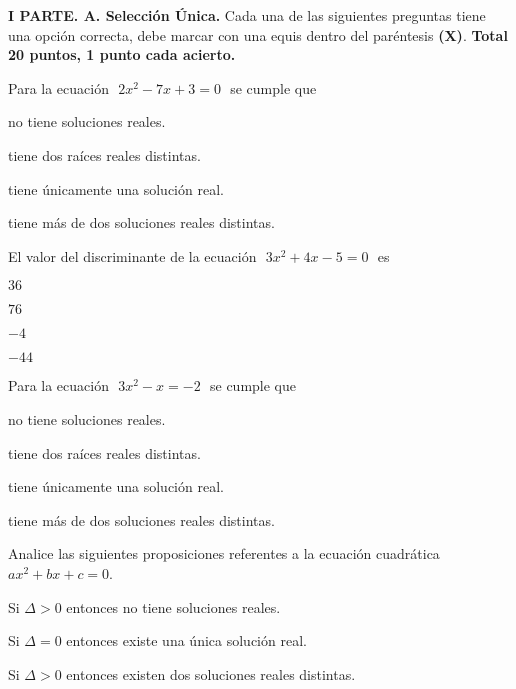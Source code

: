 \documentclass[12pt, fleqn]{article}
\begin{document}
\sf

\setcounter{page}{2} 

\vspace{-2cm}
{\bf I PARTE. A. Selección Única.} Cada una de las siguientes preguntas tiene una opción correcta, debe marcar con una equis dentro del paréntesis {\bf (X)}. {\bf Total 20 puntos, 1 punto cada acierto.}
\vp

\benu
\item Para la ecuación $\,\,2x^2-7x+3=0\,\,$ se cumple que \vp

\benu
\item[] \opc no tiene soluciones reales.
\item[] \opc tiene dos raíces reales distintas.
\item[] \opc tiene únicamente una solución real.
\item[] \opc tiene más de dos soluciones reales distintas.
\eenu
\vs

\item El valor del discriminante de la ecuación  $\,\,3x^2+4x-5=0\,\,$ es \vp

\benu
\item[] \opc $36$
\item[] \opc $76$
\item[] \opc $-4$
\item[] \opc $-44$
\eenu
\vs

\item Para la ecuación $\,\,3x^2-x=-2\,\,$ se cumple que \vp

\benu
\item[] \opc no tiene soluciones reales.
\item[] \opc tiene dos raíces reales distintas.
\item[] \opc tiene únicamente una solución real.
\item[] \opc tiene más de dos soluciones reales distintas.
\eenu
\vs

\item Analice las siguientes proposiciones referentes a la ecuación cuadrática $ax^2+bx+c=0$.
\vp

\begin{tcolorbox}
\bc
\benu
\item[I.] Si $\Delta>0$ entonces no tiene soluciones reales.
\item[II.] Si $\Delta=0$ entonces existe una única solución real.
\item[I.] Si $\Delta>0$ entonces existen dos soluciones reales distintas.
\eenu
\ec
\end{tcolorbox}
\end{document}
